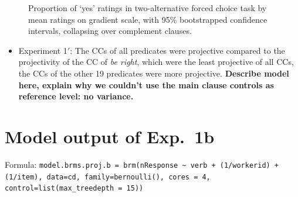 \documentclass[11pt,fleqn]{article}
\newcommand{\6}{\mbox{$[\hspace*{-.6mm}[$}}
\newcommand{\9}{\mbox{$]\hspace*{-.6mm}]$}}
\begin{document}
{\begin{figure}[h!]
\caption{Proportion of `yes' ratings in two-alternative forced choice task by mean ratings on gradient scale, with 95\% bootstrapped confidence intervals, collapsing over complement clauses.}
\label{f-comparison}
\end{figure}

\begin{itemize}

\item Experiment 1$'$: The CCs of all predicates were projective compared to the projectivity of the CC of {\em be right}, which were the least projective of all CCs, the CCs of the other 19 predicates were more projective. {\bf Describe model here, explain why we couldn't use the main clause controls as reference level: no variance.}

\end{itemize}

\section{Model output of Exp.~1b}

Formula: \tiny \verb|model.brms.proj.b = brm(nResponse ~ verb + (1/workerid) + (1/item), data=cd, family=bernoulli(), cores = 4, control=list(max_treedepth = 15))| \normalsize

}
\end{document}

